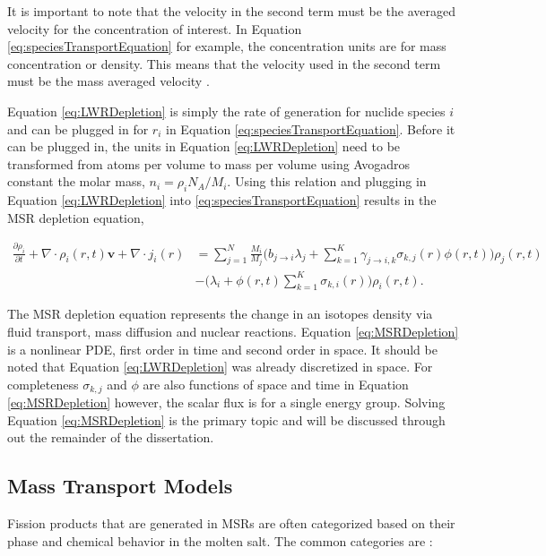 \noindent It is important to note that the velocity in the second term must be the averaged velocity for the concentration of interest. In Equation \ref{eq:speciesTransportEquation} for example, the concentration units are for mass concentration or density. This means that the velocity used in the second term must be the mass averaged velocity \cite{zackThesis}. 

Equation \ref{eq:LWRDepletion} is simply the rate of generation for nuclide species $\textit{i}$ and can be plugged in for $r_{i}$ in Equation \ref{eq:speciesTransportEquation}. Before it can be plugged in, the units in Equation \ref{eq:LWRDepletion} need to be transformed from atoms per volume to mass per volume using Avogadros constant the molar mass, $n_{i} = \rho_{i}N_{A} / M_{i}$. Using this relation and plugging in Equation \ref{eq:LWRDepletion} into \ref{eq:speciesTransportEquation} results in the MSR depletion equation,


\begin{equation}
\begin{split}
    \frac{\partial \rho_{i}}{\partial t}
    + \nabla \cdot \rho_{i}(r,t)\boldsymbol{v}
    + \nabla \cdot j_{i}(r)
    &=
    \sum_{j=1}^{N}\frac{M_{i}}{M_{j}}\bigg(b_{j\rightarrow i}\lambda_{j} + 
    \sum_{k=1}^{K}\gamma_{j\rightarrow i,k}\sigma_{k,j}(r)\phi(r,t) \bigg)\rho_{j}(r,t)\\
    &- \bigg(\lambda_{i} + \phi(r,t)\sum_{k=1}^{K} \sigma_{k,i}(r)\bigg)\rho_{i}(r,t).
\end{split}
    \label{eq:MSRDepletion}
\end{equation}

The MSR depletion equation represents the change in an isotopes density via fluid transport, mass diffusion and nuclear reactions. Equation \ref{eq:MSRDepletion} is a nonlinear PDE, first order in time and second order in space. It should be noted that Equation \ref{eq:LWRDepletion} was already discretized in space. For completeness $\sigma_{k,j}$ and $\phi$ are also functions of space and time in Equation \ref{eq:MSRDepletion} however, the scalar flux is for a single energy group. Solving Equation \ref{eq:MSRDepletion} is the primary topic and will be discussed through out the remainder of the dissertation.

\subsection{Mass Transport Models}
Fission products that are generated in MSRs are often categorized based on their phase and chemical behavior in the molten salt. The common categories are \cite{grimes1975}: 

